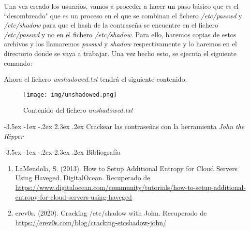 \documentclass[11pt]{report}
\makeatletter
\renewcommand\chapter{\@startsection{chapter}{0}{\z@}%
    {-3.5ex \@plus -1ex \@minus -.2ex}%
    {2.3ex \@plus.2ex}%
    {\normalfont\Large\bfseries}}
\makeatother
\begin{document}
Una vez creado los usuarios, vamos a proceder a hacer un paso básico que es el “desombreado" que es 
un proceso en el que se combinan el fichero \emph{/etc/passwd} y \emph{/etc/shadow} para que el hash de
la contraseña se encuentre en el fichero \emph{/etc/passwd} y no en el fichero \emph{/etc/shadow}. Para
ello, haremos copias de estos archivos y los llamaremos \emph{passwd} y \emph{shadow} respectivamente y lo haremos
en el directorio donde se vaya a trabajar. Una vez hecho esto, se ejecuta el siguiente comando:
\lstset{style=mystyle}


Ahora el fichero \emph{unshadowed.txt} tendrá el siguiente contenido:
\begin{figure}[H]
  \centering
  \texttt{[image: img/unshadowed.png]}
  \caption{Contenido del fichero \emph{unshadowed.txt}}
  \label{fig:contenido del fichero unshadow.txt}
\end{figure}

\cleardoublepage

\chapter{Crackear las contraseñas con la herramienta \emph{John the Ripper}}


\cleardoublepage

\chapter{Bibliografía} %
\begin{enumerate}
\item LaMendola, S. (2013). How to Setup Additional Entropy for Cloud Servers Using Haveged. DigitalOcean. Recuperado de \url{https://www.digitalocean.com/community/tutorials/how-to-setup-additional-entropy-for-cloud-servers-using-haveged}
\item erev0s. (2020). Cracking /etc/shadow with John. Recuperado de \url{https://erev0s.com/blog/cracking-etcshadow-john/}  
\end{enumerate}
\end{document}
